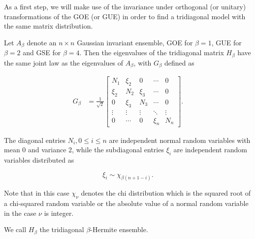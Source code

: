 As a first step, we will make use of the invariance under orthogonal (or unitary) transformations of the GOE (or GUE) in order to find a tridiagonal model with the same matrix distribution.


\begin{lemma} \label{lemma:tridiag}
    Let $A_{\beta}$ denote an $n\times n$ Gaussian invariant ensemble, GOE for $\beta=1$, GUE for $\beta =2$ and GSE for $\beta=4$. Then the eigenvalues of the tridiagonal matrix $H_\beta$ have the same joint law as the eigenvalues of $A_\beta$, with $G_\beta$ defined as

    \begin{align} \label{eq:tridiag_hermite}
        G_\beta &= \frac1{\sqrt2}\begin{bmatrix}
            N_1   & \xi_2 & 0     & \cdots & 0 \\ 
            \xi_2 & N_2   & \xi_3 & \cdots & 0 \\
            0     & \xi_3 & N_3  & \cdots & 0 \\
            \vdots & \vdots & \vdots & \ddots & \vdots \\ 
            0      & \cdots & 0      & \xi_{n} & N_n 
        \end{bmatrix}.
    \end{align}

    The diagonal entries $N_i, 0 \le i \le n$ are independent normal random variables with mean 0 and variance 2, while the subdiagonal entries $\xi_i$ are independent random variables distributed as

    \[ \xi_i \sim \chi_{\beta(n+1-i)}. \]

    Note that in this case $\chi_\nu$ denotes the chi distribution which is the squared root of a chi-squared random variable or the absolute value of a normal random variable in the case $\nu$ is integer.

    We call $H_\beta$ the tridiagonal $\beta$-Hermite ensemble.
\end{lemma}

